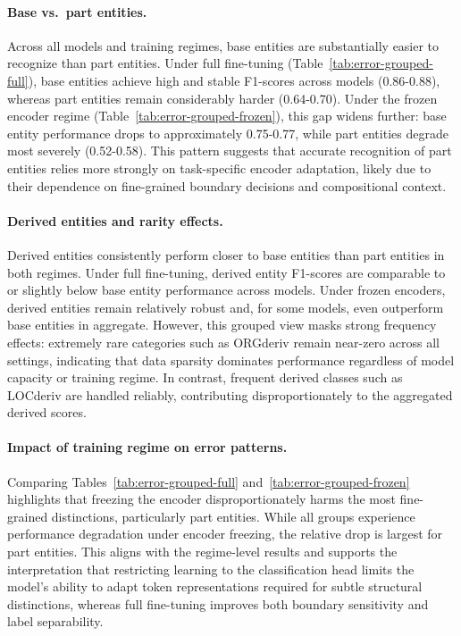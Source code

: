 \documentclass[11pt,a4paper,twocolumn]{article}
\begin{document}
\paragraph{Base vs.\ part entities.}
Across all models and training regimes, base entities are substantially easier to recognize than part entities.
Under full fine-tuning (Table~\ref{tab:error-grouped-full}), base entities achieve high and stable F1-scores across models (0.86-0.88), whereas part entities remain considerably harder (0.64-0.70).
Under the frozen encoder regime (Table~\ref{tab:error-grouped-frozen}), this gap widens further: base entity performance drops to approximately 0.75-0.77, while part entities degrade most severely (0.52-0.58).
This pattern suggests that accurate recognition of part entities relies more strongly on task-specific encoder adaptation, likely due to their dependence on fine-grained boundary decisions and compositional context.

\paragraph{Derived entities and rarity effects.}
Derived entities consistently perform closer to base entities than part entities in both regimes.
Under full fine-tuning, derived entity F1-scores are comparable to or slightly below base entity performance across models.
Under frozen encoders, derived entities remain relatively robust and, for some models, even outperform base entities in aggregate.
However, this grouped view masks strong frequency effects: extremely rare categories such as ORGderiv remain near-zero across all settings, indicating that data sparsity dominates performance regardless of model capacity or training regime.
In contrast, frequent derived classes such as LOCderiv are handled reliably, contributing disproportionately to the aggregated derived scores.

\paragraph{Impact of training regime on error patterns.}
Comparing Tables~\ref{tab:error-grouped-full} and~\ref{tab:error-grouped-frozen} highlights that freezing the encoder disproportionately harms the most fine-grained distinctions, particularly part entities.
While all groups experience performance degradation under encoder freezing, the relative drop is largest for part entities.
This aligns with the regime-level results and supports the interpretation that restricting learning to the classification head limits the model’s ability to adapt token representations required for subtle structural distinctions, whereas full fine-tuning improves both boundary sensitivity and label separability.
\end{document}

